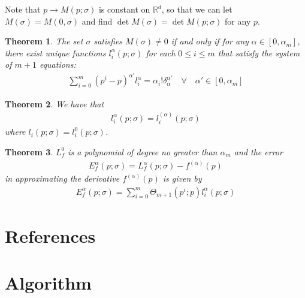 \documentclass{article}
\newtheorem{theorem}{Theorem}[section]
\theoremstyle{case}
\begin{document}
Note that $p \to M(p; \sigma)$ is constant on $\mathbb R^d$, so that we can let $M(\sigma) = M(0, \sigma)$ and find $\det M(\sigma) = \det M(p; \sigma)$ for any $p$.

\begin{theorem}
The set $\sigma$ satisfies $M(\sigma) \ne 0$ if and only if for any $\alpha \in [0, \alpha_m]$, there exist 
unique functions $l_i^{\alpha}(p; \sigma)$ for each $0\le i\le m$ that satisfy the system of $m+1$ equations:
\begin{align*}
\sum_{i=0}^m \left(p^i - p\right)^{\alpha'} l_i^{\alpha} = \alpha_i!\delta_{\alpha}^{\alpha'} \quad \forall \quad \alpha' \in [0, \alpha_m]
\end{align*}
\end{theorem}

\begin{theorem}
We have that
\begin{align*}
l_i^{\alpha}(p; \sigma) = l_i^{(\alpha)}(p; \sigma)
\end{align*}
where $l_i(p; \sigma) = l_i^{0}(p; \sigma)$.
\end{theorem}

\begin{theorem}
$L_f^0$ is a polynomial of degree no greater than $\alpha_m$ and the error
\begin{align*}
E_f^{\alpha}(p; \sigma) = L_f^{\alpha}(p; \sigma) - f^{(\alpha)}(p)
\end{align*}
in approximating the derivative $f^{(\alpha)}(p)$ is given by
\begin{align*}
E_f^{\alpha}(p; \sigma) = \sum_{i=0}^m \Theta_{m+1}(p^i; p) l_i^{\alpha}(p; \sigma)
\end{align*}
\end{theorem}


\section{References}


\section{Algorithm}
\end{document}
